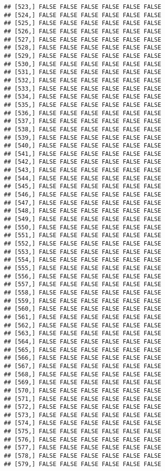 \documentclass[
]{article}
\begin{document}
\begin{verbatim}
## [523,] FALSE FALSE FALSE FALSE FALSE FALSE
## [524,] FALSE FALSE FALSE FALSE FALSE FALSE
## [525,] FALSE FALSE FALSE FALSE FALSE FALSE
## [526,] FALSE FALSE FALSE FALSE FALSE FALSE
## [527,] FALSE FALSE FALSE FALSE FALSE FALSE
## [528,] FALSE FALSE FALSE FALSE FALSE FALSE
## [529,] FALSE FALSE FALSE FALSE FALSE FALSE
## [530,] FALSE FALSE FALSE FALSE FALSE FALSE
## [531,] FALSE FALSE FALSE FALSE FALSE FALSE
## [532,] FALSE FALSE FALSE FALSE FALSE FALSE
## [533,] FALSE FALSE FALSE FALSE FALSE FALSE
## [534,] FALSE FALSE FALSE FALSE FALSE FALSE
## [535,] FALSE FALSE FALSE FALSE FALSE FALSE
## [536,] FALSE FALSE FALSE FALSE FALSE FALSE
## [537,] FALSE FALSE FALSE FALSE FALSE FALSE
## [538,] FALSE FALSE FALSE FALSE FALSE FALSE
## [539,] FALSE FALSE FALSE FALSE FALSE FALSE
## [540,] FALSE FALSE FALSE FALSE FALSE FALSE
## [541,] FALSE FALSE FALSE FALSE FALSE FALSE
## [542,] FALSE FALSE FALSE FALSE FALSE FALSE
## [543,] FALSE FALSE FALSE FALSE FALSE FALSE
## [544,] FALSE FALSE FALSE FALSE FALSE FALSE
## [545,] FALSE FALSE FALSE FALSE FALSE FALSE
## [546,] FALSE FALSE FALSE FALSE FALSE FALSE
## [547,] FALSE FALSE FALSE FALSE FALSE FALSE
## [548,] FALSE FALSE FALSE FALSE FALSE FALSE
## [549,] FALSE FALSE FALSE FALSE FALSE FALSE
## [550,] FALSE FALSE FALSE FALSE FALSE FALSE
## [551,] FALSE FALSE FALSE FALSE FALSE FALSE
## [552,] FALSE FALSE FALSE FALSE FALSE FALSE
## [553,] FALSE FALSE FALSE FALSE FALSE FALSE
## [554,] FALSE FALSE FALSE FALSE FALSE FALSE
## [555,] FALSE FALSE FALSE FALSE FALSE FALSE
## [556,] FALSE FALSE FALSE FALSE FALSE FALSE
## [557,] FALSE FALSE FALSE FALSE FALSE FALSE
## [558,] FALSE FALSE FALSE FALSE FALSE FALSE
## [559,] FALSE FALSE FALSE FALSE FALSE FALSE
## [560,] FALSE FALSE FALSE FALSE FALSE FALSE
## [561,] FALSE FALSE FALSE FALSE FALSE FALSE
## [562,] FALSE FALSE FALSE FALSE FALSE FALSE
## [563,] FALSE FALSE FALSE FALSE FALSE FALSE
## [564,] FALSE FALSE FALSE FALSE FALSE FALSE
## [565,] FALSE FALSE FALSE FALSE FALSE FALSE
## [566,] FALSE FALSE FALSE FALSE FALSE FALSE
## [567,] FALSE FALSE FALSE FALSE FALSE FALSE
## [568,] FALSE FALSE FALSE FALSE FALSE FALSE
## [569,] FALSE FALSE FALSE FALSE FALSE FALSE
## [570,] FALSE FALSE FALSE FALSE FALSE FALSE
## [571,] FALSE FALSE FALSE FALSE FALSE FALSE
## [572,] FALSE FALSE FALSE FALSE FALSE FALSE
## [573,] FALSE FALSE FALSE FALSE FALSE FALSE
## [574,] FALSE FALSE FALSE FALSE FALSE FALSE
## [575,] FALSE FALSE FALSE FALSE FALSE FALSE
## [576,] FALSE FALSE FALSE FALSE FALSE FALSE
## [577,] FALSE FALSE FALSE FALSE FALSE FALSE
## [578,] FALSE FALSE FALSE FALSE FALSE FALSE
## [579,] FALSE FALSE FALSE FALSE FALSE FALSE

\end{verbatim}
\end{document}
